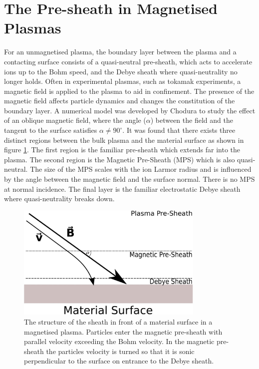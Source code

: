 \section{The Pre-sheath in Magnetised Plasmas}
For an unmagnetised plasma, the boundary layer between the plasma and a contacting surface consists of a quasi-neutral pre-sheath, which acts to accelerate ions up to the Bohm speed, and the Debye sheath where quasi-neutrality no longer holds. Often in experimental plasmas, such as tokamak experiments, a magnetic field is applied to the plasma to aid in confinement. The presence of the magnetic field affects particle dynamics and changes the constitution of the boundary layer. A numerical model was developed by Chodura \cite{Chodura} to study the effect of an oblique magnetic field, where the angle ($\alpha$) between the field and the tangent to the surface satisfies $\alpha \neq 90^\circ$. It was found that  there exists three distinct regions between the bulk plasma and the material surface as shown in figure \ref{fig:MPS}. The first region is the familiar pre-sheath which extends far into the plasma. The second region is the Magnetic Pre-Sheath (MPS) which is also quasi-neutral. The size of the MPS scales with the ion Larmor radius and is influenced by the angle between the magnetic field and the surface normal. There is no MPS at normal incidence. The final layer is the familiar electrostatic Debye sheath where quasi-neutrality breaks down. 
\begin{figure}[H]
	\centering
	\includegraphics[width=0.8\textwidth]{magnetic_pre_sheath.pdf}
	\caption{The structure of the sheath in front of a material surface in a magnetised plasma. Particles enter the magnetic pre-sheath with parallel velocity exceeding the Bohm velocity. In the magnetic pre-sheath the particles velocity is turned so that it is sonic perpendicular to the surface on entrance to the Debye sheath. }
	\label{fig:MPS}
\end{figure}


